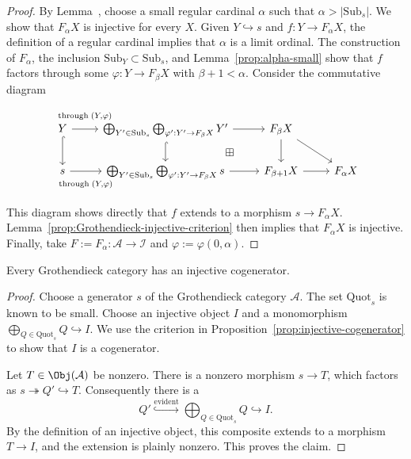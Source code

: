 \begin{proof}
	By Lemma~, choose a
	small regular cardinal $\alpha$ such that
	$\alpha>|\mathrm{Sub}_s|$. We show that $F_\alpha X$ is injective for every
	$X$. Given $Y\hookrightarrow s$ and $f:Y\to F_\alpha X$, the definition of
	a regular cardinal  implies that
	$\alpha$ is a limit ordinal. The construction of $F_\alpha$, the inclusion
	$\mathrm{Sub}_Y\subset\mathrm{Sub}_s$, and Lemma~\ref{prop:alpha-small}
	show that $f$ factors through some $\varphi:Y\to F_\beta X$ with
	$\beta+1<\alpha$. Consider the commutative diagram
	\[\begin{tikzcd}
		Y \arrow[r, "{\text{through}\; (Y, \varphi)}" inner sep=0.8em] \arrow[hookrightarrow, d] & \bigoplus_{Y' \in \mathrm{Sub}_s} \bigoplus_{\varphi': Y' \to F_\beta X} Y' \arrow[r] \arrow[hookrightarrow, d] & F_\beta X \arrow[d] \arrow[rd] & \\
		s \arrow[r, "{\text{through}\; (Y, \varphi)}"' inner sep=0.8em] & \bigoplus_{Y' \in \mathrm{Sub}_s} \bigoplus_{\varphi': Y' \to F_\beta X} s \arrow[r] & F_{\beta + 1} X \arrow[phantom, lu, "\boxplus" description] \arrow[r] & F_\alpha X
	\end{tikzcd}\]
	This diagram shows directly that $f$ extends to a morphism
	$s\to F_\alpha X$. Lemma~\ref{prop:Grothendieck-injective-criterion} then
	implies that $F_\alpha X$ is injective. Finally, take
	$F:=F_\alpha:\mathcal{A}\to\mathcal{I}$ and
	$\varphi:=\varphi(0,\alpha)$.
\end{proof}

\begin{corollary}\label{prop:Grothendieck-cat-cogenerator}
	Every Grothendieck category has an injective cogenerator.
\end{corollary}
\begin{proof}
	Choose a generator $s$ of the Grothendieck category $\mathcal{A}$. The set
	$\mathrm{Quot}_s$ is known to be small. Choose an injective object $I$ and
	a monomorphism
	$\bigoplus_{Q\in\mathrm{Quot}_s}Q\hookrightarrow I$. We use the criterion
	in Proposition~\ref{prop:injective-cogenerator} to show that $I$ is a
	cogenerator.

	Let $T\in\Obj(\mathcal{A})$ be nonzero. There is a nonzero morphism
	$s\to T$, which factors as $s\twoheadrightarrow Q'\hookrightarrow T$.
	Consequently there is a
	\[ Q' \stackrel{\text{evident}}{\hookrightarrow}
	\bigoplus_{Q \in \mathrm{Quot}_s} Q \hookrightarrow I. \]
	By the definition of an injective object, this composite extends to a
	morphism $T\to I$, and the extension is plainly nonzero. This proves the
	claim.
\end{proof}

